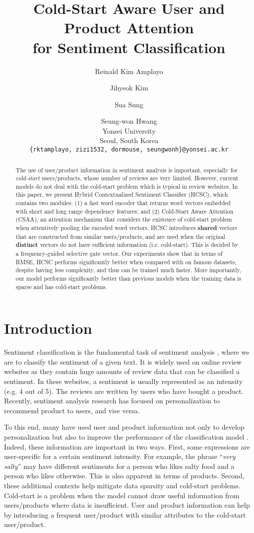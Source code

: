 \documentclass[11pt,a4paper]{article}
\title{Cold-Start Aware User and Product Attention\\for Sentiment Classification}
\author{Reinald Kim Amplayo \and
  Jihyeok Kim \and
  Sua Sung \and
  Seung-won Hwang \\
  Yonsei University \\
  Seoul, South Korea \\
  {\tt \{rktamplayo, zizi1532, dormouse, seungwonh\}@yonsei.ac.kr} \\
}
\date{}
\begin{document}
\maketitle
\begin{abstract}
  The use of user/product information in sentiment analysis is important, especially for \textit{cold-start} users/products, whose number of reviews are very limited. However, current models do not deal with the cold-start problem which is typical in review websites.
  In this paper, we present Hybrid Contextualized Sentiment Classifier (HCSC), which contains two modules:
  (1) a fast word encoder that returns word vectors embedded with short and long range dependency features; and
  (2) Cold-Start Aware Attention (CSAA), an attention mechanism that considers the existence of cold-start problem when attentively pooling the encoded word vectors.
  HCSC introduces \textbf{shared} vectors that are constructed from similar users/products, and are used when the original \textbf{distinct} vectors do not have sufficient information (i.e. cold-start). This is decided by a frequency-guided selective gate vector.
Our experiments show that in terms of RMSE, HCSC performs significantly better when compared with on famous datasets, despite having less complexity, and thus can be trained much faster. More importantly, our model performs significantly better than previous models when the training data is sparse and has cold-start problems.
\end{abstract}

\section{Introduction}

Sentiment classification is the fundamental task of sentiment analysis \cite{pang2002thumbs}, where we are to classify the sentiment of a given text.
It is widely used on online review websites as they contain huge amounts of review data that can be classified a sentiment.
In these websites, a sentiment is usually represented as an intensity (e.g. 4 out of 5).
The reviews are written by users who have bought a product.
Recently, sentiment analysis research has focused on personalization \cite{zhang2015incorporating} to recommend product to users, and vise versa.

To this end, many have used user and product information not only to develop personalization but also to improve the performance of the classification model \cite{tang2015learning}. Indeed, these information are important in two ways. First, some expressions are user-specific for a certain sentiment intensity. For example, the phrase ``\textit{very salty}'' may have different sentiments for a person who likes salty food and a person who likes otherwise. This is also apparent in terms of products. Second, these additional contexts help mitigate data sparsity and cold-start problems. Cold-start is a problem when the model cannot draw useful information from users/products where data is insufficient. User and product information can help by introducing a frequent user/product with similar attributes to the cold-start user/product.
\end{document}
